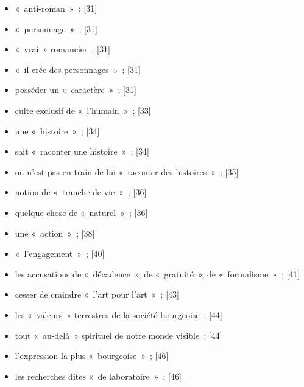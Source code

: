 \documentclass[12pt, a4paper]{article}
\begin{document}
\begin{itemize}
    \item «~anti-roman~»{\color{gray}~; [31]}

    \item «~personnage~»{\color{gray}~; [31]}

    \item «~vrai~» romancier{\color{gray}~; [31]}

    \item «~il crée des personnages~»{\color{gray}~; [31]}

    \item posséder un «~caractère~»{\color{gray}~; [31]}

    \item culte exclusif de «~l’humain~»{\color{gray}~; [33]}

    \item une «~histoire~»{\color{gray}~; [34]}

    \item sait «~raconter une histoire~»{\color{gray}~; [34]}

    \item on n’est pas en train de lui «~raconter des histoires~»{\color{gray}~; [35]}

    \item notion de «~tranche de vie~»{\color{gray}~; [36]}

    \item quelque chose de «~naturel~»{\color{gray}~; [36]}

    \item une «~action~»{\color{gray}~; [38]}

    \item «~l’engagement~»{\color{gray}~; [40]}

    \item les accusations de «~décadence~», de «~gratuité~», de «~formalisme~»{\color{gray}~; [41]}

    \item cesser de craindre «~l’art pour l’art~»{\color{gray}~; [43]}

    \item les «~valeurs~» terrestres de la société bourgeoise{\color{gray}~; [44]}

    \item tout «~au-delà~» spirituel de notre monde visible{\color{gray}~; [44]}

    \item l’expression la plus «~bourgeoise~»{\color{gray}~; [46]}

    \item les recherches dites «~de laboratoire~»{\color{gray}~; [46]}


\end{itemize}
\end{document}
